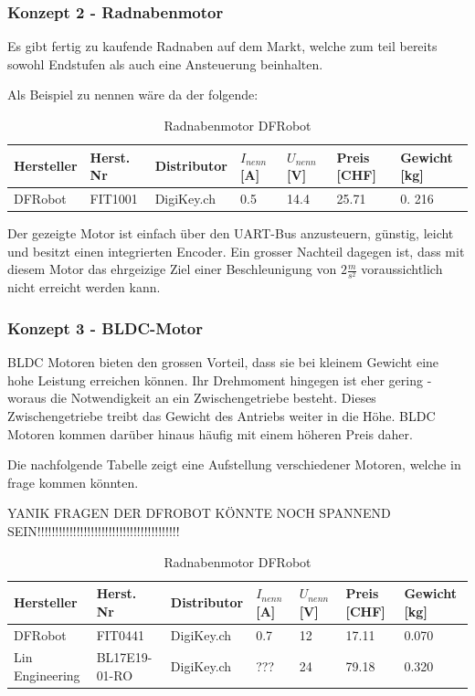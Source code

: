 \documentclass[main.tex]{subfiles} %
\begin{document}
\subsubsection*{Konzept 2 - Radnabenmotor} %

Es gibt fertig zu kaufende Radnaben auf dem Markt, welche zum teil bereits
sowohl Endstufen als auch eine Ansteuerung beinhalten.

Als Beispiel zu nennen wäre da der folgende:

\begin{table}[h]
    \centering
    \begin{tabular}{|p{2cm}|p{3cm}|p{2cm}|p{1cm}|p{1cm}|p{1cm}|p{1.5cm}|}
        \hline
        Hersteller & Herst. Nr & Distributor & $I_{nenn} $ [A] & $U_{nenn}$ [V] & Preis [CHF] & Gewicht [kg] \\ \hline
        DFRobot    & FIT1001   & DigiKey.ch  & 0.5             & 14.4           & 25.71       & 0. 216       \\ \hline
    \end{tabular}
    \caption{Radnabenmotor DFRobot}
\end{table}

Der gezeigte Motor ist einfach über den UART-Bus anzusteuern, günstig, leicht
und besitzt einen integrierten Encoder. Ein grosser Nachteil dagegen ist, dass
mit diesem Motor das ehrgeizige Ziel einer Beschleunigung von $2 \frac{m}{s^2}$
voraussichtlich nicht erreicht werden kann.

\subsubsection*{Konzept 3 - BLDC-Motor} %

BLDC Motoren bieten den grossen Vorteil, dass sie bei kleinem Gewicht eine hohe
Leistung erreichen können. Ihr Drehmoment hingegen ist eher gering - woraus die
Notwendigkeit an ein Zwischengetriebe besteht. Dieses Zwischengetriebe treibt
das Gewicht des Antriebs weiter in die Höhe. BLDC Motoren kommen darüber hinaus
häufig mit einem höheren Preis daher.

Die nachfolgende Tabelle zeigt eine Aufstellung verschiedener Motoren, welche
in frage kommen könnten.

YANIK FRAGEN DER DFROBOT KÖNNTE NOCH SPANNEND
SEIN!!!!!!!!!!!!!!!!!!!!!!!!!!!!!!!!!!!!!!!!

\begin{table}[h]
    \centering
    \begin{tabular}{|p{2cm}|p{3cm}|p{2cm}|p{1cm}|p{1cm}|p{1cm}|p{1.5cm}|}
        \hline
        Hersteller      & Herst. Nr     & Distributor & $I_{nenn} $ [A] & $U_{nenn}$ [V] & Preis [CHF] & Gewicht [kg] \\ \hline
        DFRobot         & FIT0441       & DigiKey.ch  & 0.7             & 12             & 17.11       & 0.070        \\ \hline
        Lin Engineering & BL17E19-01-RO & DigiKey.ch  & ???             & 24             & 79.18       & 0.320        \\ \hline
    \end{tabular}
    \caption{Radnabenmotor DFRobot}
\end{table}
\end{document}
